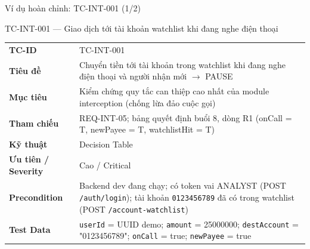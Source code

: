 \documentclass[aspectratio=169,12pt]{beamer}
\begin{document}
\begin{frame}[shrink=8]{Ví dụ hoàn chỉnh: TC-INT-001 (1/2)}
  \begin{exampleblock}{TC-INT-001 --- Giao dịch tới tài khoản watchlist khi đang nghe điện thoại}
    \small
    \renewcommand{\arraystretch}{1.02}
    \begin{tabular}{>{\raggedright\arraybackslash}p{2.9cm}>{\raggedright\arraybackslash}p{8.6cm}}
      \textbf{TC-ID}       & TC-INT-001 \\
      \textbf{Tiêu đề}     & Chuyển tiền tới tài khoản trong watchlist khi
                             đang nghe điện thoại và người nhận mới $\to$ PAUSE \\
      \textbf{Mục tiêu}    & Kiểm chứng quy tắc can thiệp cao nhất của module
                             interception (chống lừa đảo cuộc gọi) \\
      \textbf{Tham chiếu}  & REQ-INT-05; bảng quyết định buổi 8, dòng R1
                             (onCall = T, newPayee = T, watchlistHit = T) \\
      \textbf{Kỹ thuật}    & Decision Table \\
      \textbf{Ưu tiên / Severity} & Cao / Critical \\
      \textbf{Precondition}& Backend dev đang chạy; có token vai ANALYST
                             (POST \texttt{/auth/login});
                             tài khoản \texttt{0123456789} đã có trong
                             watchlist (POST \texttt{/account-watchlist}) \\
      \textbf{Test Data}   & \texttt{userId} = UUID demo; \texttt{amount} = 25000000;
                             \texttt{destAccount} = "0123456789";
                             \texttt{onCall} = true; \texttt{newPayee} = true \\
    \end{tabular}
    \renewcommand{\arraystretch}{1}
  \end{exampleblock}
\end{frame}
\end{document}
